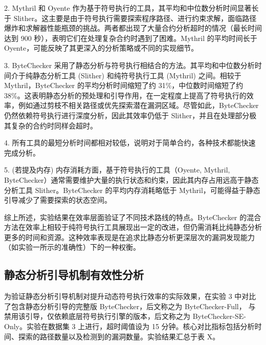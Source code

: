 \documentclass[print, master, vlined, timesmath]{DissertUESTC}
\begin{document}
2.  Mythril 和 Oyente 作为基于符号执行的工具，其平均和中位数分析时间显著长于 Slither。这主要是由于符号执行需要探索程序路径、进行约束求解，面临路径爆炸和求解器性能瓶颈的挑战。两者都出现了大量合约分析超时的情况（最长时间达到 900 秒），表明它们在处理复杂合约时遇到了困难。Mythril 的平均时间长于 Oyente，可能反映了其更深入的分析策略或不同的实现细节。

3.  ByteChecker 采用了静态分析与符号执行相结合的方法。其平均和中位数分析时间介于纯静态分析工具 (Slither) 和纯符号执行工具 (Mythril) 之间。相较于 Mythril，ByteChecker 的平均分析时间缩短了约 31\%，中位数时间缩短了约 38\%。这表明静态分析的预处理和引导作用，在一定程度上提高了符号执行的效率，例如通过剪枝不相关路径或优先探索潜在漏洞区域。尽管如此，ByteChecker 仍然依赖符号执行进行深度分析，因此其效率仍低于 Slither，并且在处理部分极其复杂的合约时同样会超时。

4.  所有工具的最短分析时间都相对较低，说明对于简单合约，各种技术都能快速完成分析。

5.  (若提及内存) 内存消耗方面，基于符号执行的工具（Oyente, Mythril, ByteChecker）通常需要维护大量的执行状态和约束，因此其内存占用远高于静态分析工具 Slither。ByteChecker 的平均内存消耗略低于 Mythril，可能得益于静态引导减少了需要探索的状态空间。

综上所述，实验结果在效率层面验证了不同技术路线的特点。ByteChecker 的混合方法在效率上相较于纯符号执行工具展现出一定的改进，但仍需消耗比纯静态分析更多的时间和资源。这种效率表现是在追求比静态分析更深层次的漏洞发现能力（如实验一所示的准确性）下的一种权衡。


    
\subsection{静态分析引导机制有效性分析}
    
为验证静态分析引导机制对提升动态符号执行效率的实际效果，在实验 3 中对比了包含静态分析引导的完整版 ByteChecker，后文称之为 ByteChecker-Full， 与禁用该引导，仅依赖底层符号执行引擎的版本，后文称之为  ByteChecker-SE-Only。实验在数据集 3 上进行，超时阈值设为 15 分钟。核心对比指标包括分析时间、探索的路径数量以及检测到的漏洞数量。实验结果汇总于表 X。
\end{document}

